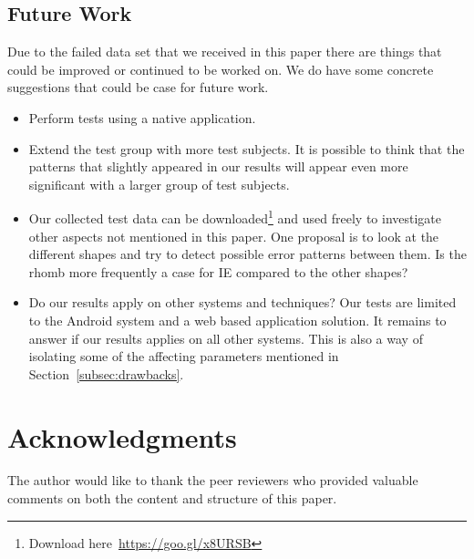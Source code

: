 \documentclass[runningheads,a4paper]{llncs}
\begin{document}
\subsection{Future Work}
Due to the failed data set that we received in this paper there are things that could be improved or continued to be worked on. 
We do have some concrete suggestions that could be case for future work. 

\begin{itemize}
	\item Perform tests using a native application.
	\item Extend the test group with more test subjects. It is possible to think that the patterns that slightly appeared in our results will appear even more significant with a larger group of test subjects.
	\item Our collected test data can be downloaded\footnote{Download here~\url{https://goo.gl/x8URSB}} and used freely to investigate other aspects not mentioned in this paper. One proposal is to look at the different shapes and try to detect possible error patterns between them. Is the rhomb more frequently a case for IE compared to the other shapes?
	\item Do our results apply on other systems and techniques? Our tests are limited to the Android system and a web based application solution. It remains to answer if our results applies on all other systems. This is also a way of isolating some of the affecting parameters mentioned in Section~\ref{subsec:drawbacks}.
\end{itemize}

\section{Acknowledgments}
The author would like to thank the peer reviewers who provided valuable comments on both the content and structure of this paper.

%
% 
%
%

%


\end{document}
